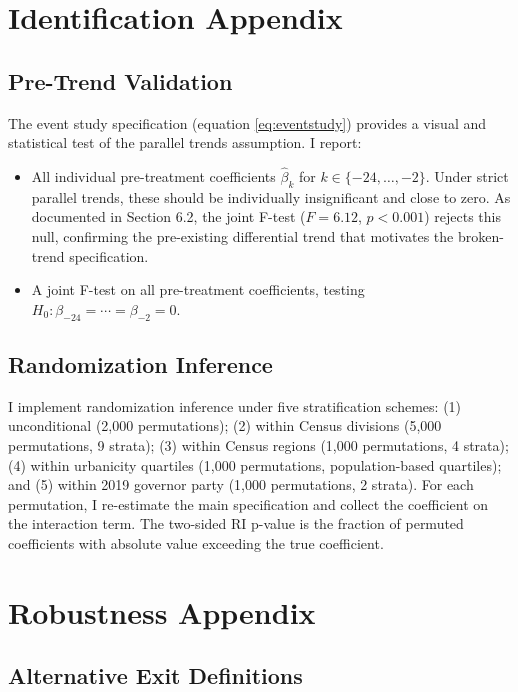 \documentclass[12pt]{article}
\begin{document}
\section{Identification Appendix}

\subsection{Pre-Trend Validation}

The event study specification (equation \ref{eq:eventstudy}) provides a visual and statistical test of the parallel trends assumption. I report:
\begin{itemize}
\item All individual pre-treatment coefficients $\hat{\beta}_k$ for $k \in \{-24, \ldots, -2\}$. Under strict parallel trends, these should be individually insignificant and close to zero. As documented in Section 6.2, the joint F-test ($F = 6.12$, $p < 0.001$) rejects this null, confirming the pre-existing differential trend that motivates the broken-trend specification.
\item A joint F-test on all pre-treatment coefficients, testing $H_0: \beta_{-24} = \cdots = \beta_{-2} = 0$.
\end{itemize}

\subsection{Randomization Inference}

I implement randomization inference under five stratification schemes: (1) unconditional (2,000 permutations); (2) within Census divisions (5,000 permutations, 9 strata); (3) within Census regions (1,000 permutations, 4 strata); (4) within urbanicity quartiles (1,000 permutations, population-based quartiles); and (5) within 2019 governor party (1,000 permutations, 2 strata). For each permutation, I re-estimate the main specification and collect the coefficient on the interaction term. The two-sided RI p-value is the fraction of permuted coefficients with absolute value exceeding the true coefficient.

\section{Robustness Appendix}

\subsection{Alternative Exit Definitions}
\end{document}
